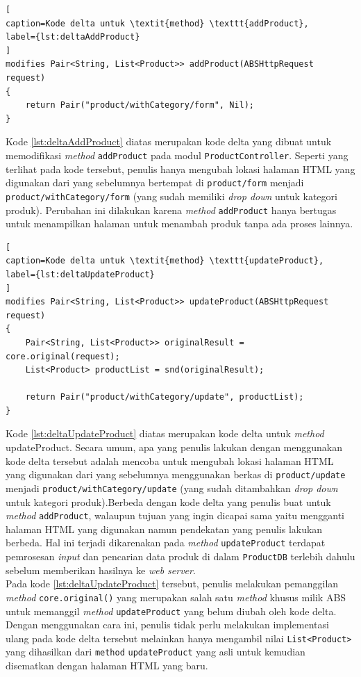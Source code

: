 \begin{lstlisting}[
caption=Kode delta untuk \textit{method} \texttt{addProduct},
label={lst:deltaAddProduct}
]
modifies Pair<String, List<Product>> addProduct(ABSHttpRequest request)
{	
	return Pair("product/withCategory/form", Nil);
}
\end{lstlisting}

Kode \ref{lst:deltaAddProduct} diatas merupakan kode delta yang dibuat untuk memodifikasi \textit{method} \texttt{addProduct} pada modul \texttt{ProductController}. Seperti yang terlihat pada kode tersebut, penulis hanya mengubah lokasi halaman HTML yang digunakan dari yang sebelumnya bertempat di \texttt{product/form} menjadi \texttt{product/withCategory/form} (yang sudah memiliki \textit{drop down} untuk kategori produk). Perubahan ini dilakukan karena \textit{method} \texttt{addProduct} hanya bertugas untuk menampilkan halaman untuk menambah produk tanpa ada proses lainnya.

\begin{lstlisting}[
caption=Kode delta untuk \textit{method} \texttt{updateProduct},
label={lst:deltaUpdateProduct}
]
modifies Pair<String, List<Product>> updateProduct(ABSHttpRequest request)
{
	Pair<String, List<Product>> originalResult = core.original(request);
	List<Product> productList = snd(originalResult);
	
	return Pair("product/withCategory/update", productList);
}
\end{lstlisting}

Kode \ref{lst:deltaUpdateProduct} diatas merupakan kode delta untuk \textit{method} updateProduct. Secara umum, apa yang penulis lakukan dengan menggunakan kode delta tersebut adalah mencoba untuk mengubah lokasi halaman HTML yang digunakan dari yang sebelumnya menggunakan berkas di \texttt{product/update} menjadi \texttt{product/withCategory/update} (yang sudah ditambahkan \textit{drop down} untuk kategori produk).Berbeda dengan kode delta yang penulis buat untuk \textit{method} \texttt{addProduct}, walaupun tujuan yang ingin dicapai sama yaitu mengganti halaman HTML yang digunakan namun pendekatan yang penulis lakukan berbeda. Hal ini terjadi dikarenakan pada \textit{method} \texttt{updateProduct} terdapat pemrosesan \textit{input} dan pencarian data produk di dalam \texttt{ProductDB} terlebih dahulu sebelum memberikan hasilnya ke \textit{web server}.\\

Pada kode \ref{lst:deltaUpdateProduct} tersebut, penulis melakukan pemanggilan \textit{method} \texttt{core.original()} yang merupakan salah satu \textit{method} khusus milik ABS untuk memanggil \textit{method} \texttt{updateProduct} yang belum diubah oleh kode delta. Dengan menggunakan cara ini, penulis tidak perlu melakukan implementasi ulang pada kode delta tersebut melainkan hanya mengambil nilai \texttt{List<Product>} yang dihasilkan dari \texttt{method} \texttt{updateProduct} yang asli untuk kemudian disematkan dengan halaman HTML yang baru.


